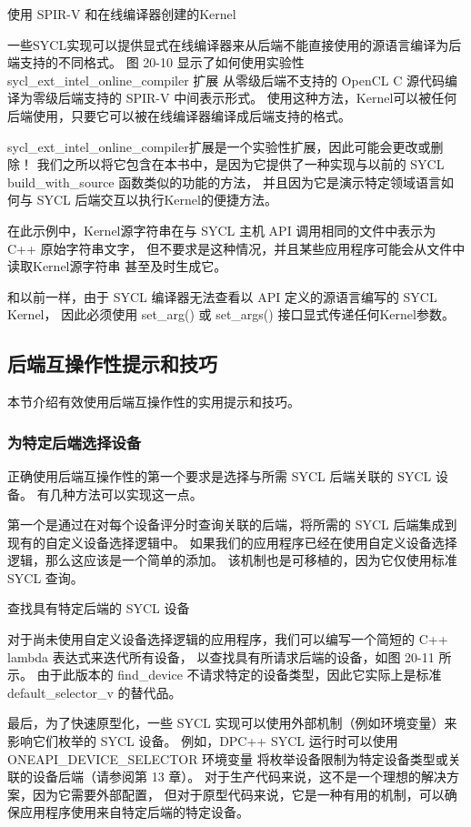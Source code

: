 {\color{red} 使用 SPIR-V 和在线编译器创建的Kernel}

一些SYCL实现可以提供显式在线编译器来从后端不能直接使用的源语言编译为后端支持的不同格式。 
图 20-10 显示了如何使用实验性 sycl\_ext\_intel\_online\_compiler 扩展
从零级后端不支持的 OpenCL C 源代码编译为零级后端支持的 SPIR-V 中间表示形式。 
使用这种方法，Kernel可以被任何后端使用，只要它可以被在线编译器编译成后端支持的格式。

\begin{remark}[注意，实验性扩展！]
sycl\_ext\_intel\_online\_compiler扩展是一个实验性扩展，因此可能会更改或删除！
我们之所以将它包含在本书中，是因为它提供了一种实现与以前的 SYCL build\_with\_source 函数类似的功能的方法，
并且因为它是演示特定领域语言如何与 SYCL 后端交互以执行Kernel的便捷方法。
\end{remark}

在此示例中，Kernel源字符串在与 SYCL 主机 API 调用相同的文件中表示为 C++ 原始字符串文字，
但不要求是这种情况，并且某些应用程序可能会从文件中读取Kernel源字符串 甚至及时生成它。

和以前一样，由于 SYCL 编译器无法查看以 API 定义的源语言编写的 SYCL Kernel，
因此必须使用 set\_arg() 或 set\_args() 接口显式传递任何Kernel参数。

\subsection{后端互操作性提示和技巧}
本节介绍有效使用后端互操作性的实用提示和技巧。

\subsubsection{为特定后端选择设备}
正确使用后端互操作性的第一个要求是选择与所需 SYCL 后端关联的 SYCL 设备。 
有几种方法可以实现这一点。

第一个是通过在对每个设备评分时查询关联的后端，将所需的 SYCL 后端集成到现有的自定义设备选择逻辑中。 
如果我们的应用程序已经在使用自定义设备选择逻辑，那么这应该是一个简单的添加。 
该机制也是可移植的，因为它仅使用标准 SYCL 查询。

{\color{red} 查找具有特定后端的 SYCL 设备}

对于尚未使用自定义设备选择逻辑的应用程序，我们可以编写一个简短的 C++ lambda 表达式来迭代所有设备，
以查找具有所请求后端的设备，如图 20-11 所示。 
由于此版本的 find\_device 不请求特定的设备类型，因此它实际上是标准 default\_selector\_v 的替代品。

最后，为了快速原型化，一些 SYCL 实现可以使用外部机制（例如环境变量）来影响它们枚举的 SYCL 设备。 
例如，DPC++ SYCL 运行时可以使用 ONEAPI\_DEVICE\_SELECTOR 环境变量
将枚举设备限制为特定设备类型或关联的设备后端（请参阅第 13 章）。 
对于生产代码来说，这不是一个理想的解决方案，因为它需要外部配置，
但对于原型代码来说，它是一种有用的机制，可以确保应用程序使用来自特定后端的特定设备。

